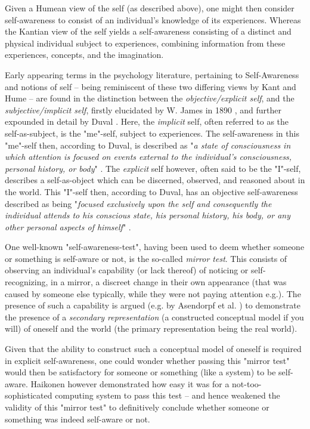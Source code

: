 \documentclass{article}
\begin{document}
Given a Humean view of the self (as described above), one might then consider self-awareness to consist of an individual's knowledge of its experiences. Whereas the Kantian view of the self yields a self-awareness consisting of a distinct and physical individual subject to experiences, combining information from these experiences, concepts, and the imagination.

Early appearing terms in the psychology literature, pertaining to Self-Awareness and notions of self -- being reminiscent of these two differing views by Kant and Hume -- are found in the distinction between the \textit{objective/explicit self}, and the \textit{subjective/implicit self}, firstly elucidated by W. James in 1890 \cite{james_explicit_implicit_self}, and further expounded in detail by Duval \cite{duval111}. Here, the \textit{implicit} self, often referred to as the self-as-subject, is the "me"-self, subject to experiences. The self-awareness in this "me"-self then, according to Duval, is described as "\textit{a state of consciousness in which attention is focused on events external to the individual's consciousness, personal history, or body}" \cite{duval111}. The \textit{explicit} self however, often said to be the "I"-self, describes a self-as-object which can be discerned, observed, and reasoned about in the world. This "I"-self then, according to Duval, has an objective self-awareness described as being "\textit{focused exclusively upon the self and consequently the individual attends to his conscious state, his personal history, his body, or any other personal aspects of himself}" \cite{duval111}.

One well-known "self-awareness-test", having been used to deem whether someone or something is self-aware or not, is the so-called \textit{mirror test}. This consists of observing an individual's capability (or lack thereof) of noticing or self-recognizing, in a mirror, a discreet change in their own appearance (that was caused by someone else typically, while they were not paying attention e.g.). The presence of such a capability is argued (e.g. by Asendorpf et al. \cite{asendorpf}) to demonstrate the presence of a \textit{secondary representation} (a constructed conceptual model if you will) of oneself and the world (the primary representation being the real world). 

Given that the ability to construct such a conceptual model of oneself is required in explicit self-awareness, one could wonder whether passing this "mirror test" would then be satisfactory for someone or something (like a system) to be self-aware. Haikonen \cite{haikonen} however demonstrated how easy it was for a not-too-sophisticated computing system to pass this test -- and hence weakened the validity of this "mirror test" to definitively conclude whether someone or something was indeed self-aware or not.
\end{document}
